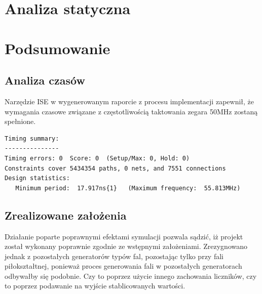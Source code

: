 \documentclass[12pt]{article}
\begin{document}
\section{Analiza statyczna}



\section{Podsumowanie}
\subsection{Analiza czasów}
Narzędzie ISE w wygenerowanym raporcie z procesu implementacji zapewnił, że wymagania czasowe związane z częstotliwością taktowania zegara 50MHz zostaną spełnione.
\begin{lstlisting}
Timing summary: 
--------------- 
Timing errors: 0  Score: 0  (Setup/Max: 0, Hold: 0) 
Constraints cover 5434354 paths, 0 nets, and 7551 connections 
Design statistics: 
   Minimum period:  17.917ns{1}   (Maximum frequency:  55.813MHz) 
\end{lstlisting}

\subsection{Zrealizowane założenia}
Działanie poparte poprawnymi efektami symulacji pozwala sądzić, iż projekt został wykonany poprawnie zgodnie ze wstępnymi założeniami. Zrezygnowano jednak z pozostałych generatorów typów fal, pozostając tylko przy fali piłokształtnej, ponieważ proces generowania fali w pozostałych generatorach odbywałby się podobnie. Czy to poprzez użycie innego zachowania liczników, czy to poprzez podawanie na wyjście stablicowanych wartości.
\end{document}
